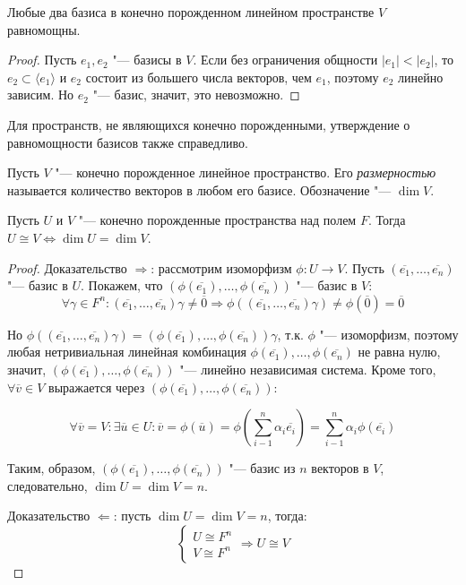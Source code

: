 \begin{corollary}
	Любые два базиса в конечно порожденном линейном пространстве $V$ равномощны.
\end{corollary}

\begin{proof}
	Пусть $e_1, e_2$ "--- базисы в $V$. Если без ограничения общности $|e_1| < |e_2|$, то $e_2 \subset \langle e_1\rangle$ и $e_2$ состоит из большего числа векторов, чем $e_1$, поэтому $e_2$ линейно зависим. Но $e_2$ "--- базис, значит, это невозможно.
\end{proof}

\begin{note}
	Для пространств, не являющихся конечно порожденными, утверждение о равномощности базисов также справедливо.
\end{note}

\begin{definition}
	Пусть $V$ "--- конечно порожденное линейное пространство. Его \textit{размерностью} называется количество векторов в любом его базисе. Обозначение "--- $\dim{V}$.
\end{definition}

\begin{theorem}
	Пусть $U$ и $V$ "--- конечно порожденные пространства над полем $F$. Тогда $U \cong V \Leftrightarrow \dim{U} = \dim{V}$.
\end{theorem}

\begin{proof}
	Доказательство $\Rightarrow$: рассмотрим изоморфизм $\phi : U \rightarrow V$. Пусть $(\overline{e_1}, \dots, \overline{e_n})$ "--- базис в $U$. Покажем, что $(\phi(\overline{e_1}), \dots, \phi(\overline{e_n}))$ "--- базис в $V$:
	\[\forall \gamma \in F^n: (\overline{e_1}, \dots, \overline{e_n})\gamma \ne \overline{0} \Rightarrow \phi((\overline{e_1}, \dots, \overline{e_n})\gamma) \ne \phi(\overline{0}) = \overline{0}\]
	
	Но $\phi((\overline{e_1}, \dots, \overline{e_n})\gamma) = (\phi(\overline{e_1}), \dots, \phi(\overline{e_n}))\gamma$, т.\:к. $\phi$ "--- изоморфизм, поэтому любая нетривиальная линейная комбинация $\phi(\overline{e_1}), \dots, \phi(\overline{e_n})$ не равна нулю, значит, $(\phi(\overline{e_1}), \dots, \phi(\overline{e_n}))$ "--- линейно независимая система. Кроме того, $\forall \overline{v} \in V$ выражается через $(\phi(\overline{e_1}), \dots, \phi(\overline{e_n}))$:
	
	\[\forall \overline{v} = V: \exists \overline{u} \in U: \overline{v} = \phi(\overline{u}) = \phi\left(\sum_{i - 1}^{n}\alpha_i\overline{e_i}\right) = \sum_{i - 1}^{n}\alpha_i\phi(\overline{e_i})\]
	
	Таким, образом, $(\phi(\overline{e_1}), \dots, \phi(\overline{e_n}))$ "--- базис из $n$ векторов в $V$, следовательно, $\dim{U} = \dim{V} = n$.
	
	Доказательство $\Leftarrow$: пусть $\dim{U} = \dim{V} = n$, тогда:
	\[\left\{\begin{aligned}
	U \cong F^n\\
	V \cong F^n
	\end{aligned}\right. \Rightarrow U \cong V\]
\end{proof}

